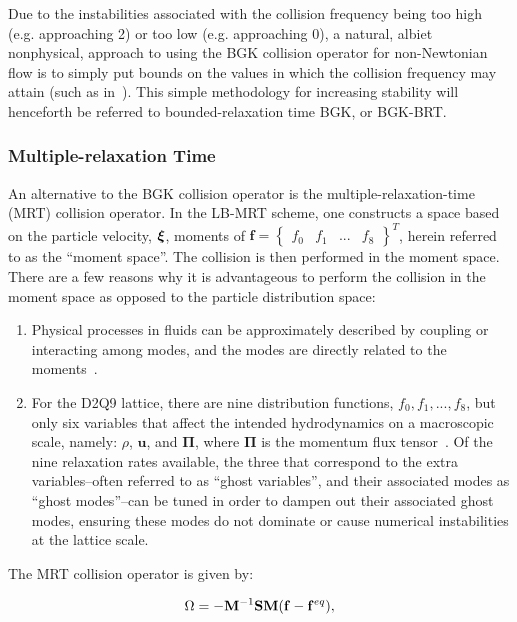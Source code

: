 Due to the instabilities associated with the collision frequency being too high (e.g. approaching 2) or too low (e.g. approaching 0), a natural, albiet nonphysical, approach to using the BGK collision operator for non-Newtonian flow is to simply put bounds on the values in which the collision frequency may attain (such as in~\citet{svec2011flow,svec2012free,gabbanelli2005lattice}).
This simple methodology for increasing stability will henceforth be referred to bounded-relaxation time BGK, or BGK-BRT.

\subsubsection{Multiple-relaxation Time} \label{sec:mrt}

An alternative to the BGK collision operator is the multiple-relaxation-time (MRT) collision operator.
In the LB-MRT scheme, one constructs a space based on the particle velocity, $\boldsymbol{\xi}$, moments of $\mathbf{f} = \begin{Bmatrix}f_0 & f_1 & ... & f_8\end{Bmatrix}^T$, herein referred to as the ``moment space''.
The collision is then performed in the moment space.
There are a few reasons why it is advantageous to perform the collision in the moment space as opposed to the particle distribution space:
\begin{enumerate}
    \item Physical processes in fluids can be approximately described by coupling or interacting among modes, and the modes are directly related to the moments~\cite{lallemand2000theory}.
    \item For the D2Q9 lattice, there are nine distribution functions, $f_0, f_1, ..., f_8$, but only six variables that affect the intended hydrodynamics on a macroscopic scale, namely: $\rho$, $\mathbf{u}$, and $\mathbf{\Pi}$, where $\mathbf{\Pi}$ is the momentum flux tensor~\cite{dellar2003incompressible}.
    Of the nine relaxation rates available, the three that correspond to the extra variables--often referred to as ``ghost variables'', and their associated modes as ``ghost modes''--can be tuned in order to dampen out their associated ghost modes, ensuring these modes do not dominate or cause numerical instabilities at the lattice scale.
\end{enumerate}

The MRT collision operator is given by:

\begin{equation} \label{eq:mrt-colop}
	\Omega = - {\mathbf{M}}^{-1} \mathbf{S} \mathbf{M} (\mathbf{f} - \mathbf{f}^{eq}),
\end{equation}

